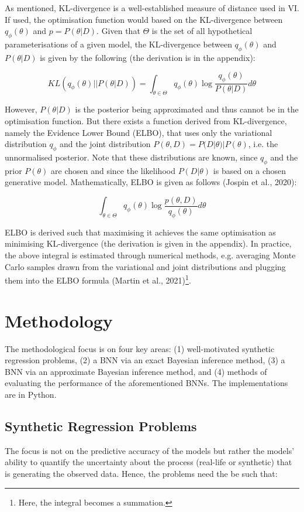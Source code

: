 \documentclass[conference]{IEEEtran}
\begin{document}
As mentioned, KL-divergence is a well-established measure of distance used in VI. If used, the optimisation function would based on the KL-divergence between $q_\phi(\theta)$ and $p = P(\theta|D)$. Given that $\Theta$ is the set of all hypothetical parameterisations of a given model, the KL-divergence between $q_\phi(\theta)$ and $P(\theta|D)$ is given by the following (the derivation is in the appendix):

\begin{equation*}
	KL(q_\phi(\theta) || P(\theta|D))
	= \int_{\theta \in \Theta} q_\phi(\theta) \log \frac{q_\phi(\theta)}{P(\theta|D)} d\theta
\end{equation*}

However, $P(\theta|D)$ is the posterior being approximated and thus cannot be in the optimisation function. But there exists a function derived from KL-divergence, namely the Evidence Lower Bound (ELBO), that uses only the variational distribution $q_\phi$ and the joint distribution $P(\theta, D) = P(D|\theta)|P(\theta)$, i.e. the unnormalised posterior. Note that these distributions are known, since $q_\phi$ and the prior $P(\theta)$ are chosen and since the likelihood $P(D|\theta)$ is based on a chosen generative model. Mathematically, ELBO is given as follows (Jospin et al., 2020):

\begin{equation*}
	\int_{\theta \in \Theta} q_\phi(\theta) \log \frac{p(\theta, D)}{q_\phi(\theta)} d\theta
\end{equation*}

ELBO is derived such that maximising it achieves the same optimisation as minimising KL-divergence (the derivation is given in the appendix). In practice, the above integral is estimated through numerical methods, e.g. averaging Monte Carlo samples drawn from the variational and joint distributions and plugging them into the ELBO formula (Martin et al., 2021)\footnote{Here, the integral becomes a summation.}.

\section{Methodology}
The methodological focus is on four key areas: (1) well-motivated synthetic regression problems, (2) a BNN via an exact Bayesian inference method, (3) a BNN via an approximate Bayesian inference method, and (4) methods of evaluating the performance of the aforementioned BNNs. The implementations are in Python.

\subsection{Synthetic Regression Problems}
The focus is not on the predictive accuracy of the models but rather the models' ability to quantify the uncertainty about the process (real-life or synthetic) that is generating the observed data. Hence, the problems need the be such that:\\
\end{document}
